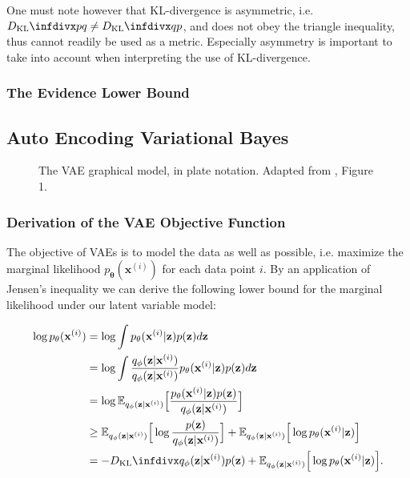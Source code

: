 One must note however that KL-divergence is asymmetric, i.e. $\dkl{p}{q} \neq \dkl{q}{p}$, and does not obey the triangle inequality, thus cannot readily be used as a metric. Especially asymmetry is important to take into account when interpreting the use of KL-divergence.

\subsubsection{The Evidence Lower Bound}

\newpage

\subsection{Auto Encoding Variational Bayes}

\begin{figure}[!htb]
  \centering
  \resizebox{0.3\textwidth}{!}{\unskip}
  \caption{The VAE graphical model, in plate notation. Adapted from \cite{aevb}, Figure 1.}
  \label{fig:aevb_plate_notation}
\end{figure}

\newcommand{\ptheta}{p_{\mathbf{\theta}}}
\newcommand{\qphi}{q_{\mathbf{\phi}}}
\newcommand{\bxi}{\mathbf{x}^{(i)}}
\newcommand{\bz}{\mathbf{z}}

\subsubsection{Derivation of the VAE Objective Function}

The objective of VAEs is to model the data as well as possible, i.e. maximize the marginal likelihood $\ptheta(\bxi)$ for each data point $i$. By an application of Jensen's inequality we can derive the following lower bound for the marginal likelihood under our latent variable model:

\begin{equation}
\begin{aligned}
\log \ptheta(\bxi) & = \log \int \ptheta(\bxi \vert \bz) p(\bz) d\bz \\
                   & = \log \int \frac{\qphi(\bz \vert \bxi)}{\qphi(\bz \vert \bxi)} \ptheta(\bxi \vert \bz) p(\bz) d\bz \\
                   & = \log \mathbb{E}_{\qphi(\bz \vert \bxi)}\Big[\frac{\ptheta(\bxi \vert \bz) p(\bz)}{\qphi(\bz \vert \bxi)}\Big] \\
                   & \geq \mathbb{E}_{\qphi(\bz \vert \bxi)}\Big[\log \frac{p(\bz)}{\qphi(\bz \vert \bxi)}\Big] + \mathbb{E}_{\qphi(\bz \vert \bxi)}\Big[\log \ptheta(\bxi \vert \bz)\Big] \\
                   & = -\dkl{\qphi(\bz \vert \bxi)}{p(\bz)} + \mathbb{E}_{\qphi(\bz \vert \bxi)}\Big[\log \ptheta(\bxi \vert \bz)\Big].
\end{aligned}
\end{equation}

